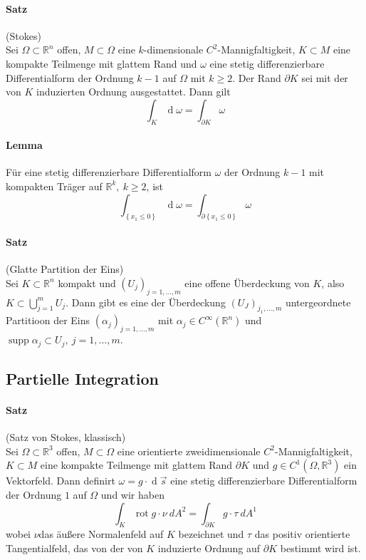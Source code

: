 \documentclass[12pt,a4paper,fleqn]{article}
\def\set#1{{\left\{ #1 \right\}}}
\def\R{{\mathbb{R}}}
\def\d{{\operatorname{d}}}
\begin{document}
\paragraph{Satz} (Stokes)\\
Sei $\Omega\subset\R^n$ offen, $M\subset\Omega$ eine $k$-dimensionale $C^2$-Mannigfaltigkeit, $K\subset M$ eine kompakte Teilmenge mit glattem Rand und $\omega$ eine stetig differenzierbare Differentialform der Ordnung $k-1$ auf $\Omega$ mit $k\geq 2$. Der Rand $\partial K$ sei mit der von $K$ induzierten Ordnung ausgestattet. Dann gilt
\begin{displaymath}
\int_K \d\omega = \int_{\partial K} \omega
\end{displaymath}

\paragraph{Lemma} Für eine stetig differenzierbare Differentialform $\omega$ der Ordnung $k-1$ mit kompakten Träger auf $\R^k,\ k\geq 2$, ist 
\begin{displaymath}
\int_{\set{x_1\leq 0}} \d \omega = \int_{\partial \set{x_1 \leq 0}} \omega
\end{displaymath}

\paragraph{Satz} (Glatte Partition der Eins)\\
Sei $K\subset \R^n$ kompakt und $(U_j)_{j=1, \dots, m}$ eine offene Überdeckung von $K$, also ${K\subset\bigcup_{j=1}^m U_j}$. Dann gibt es eine der Überdeckung $(U_J)_{j_1, \dots, m}$ untergeordnete Partitioon der Eins $(\alpha_j)_{j=1, \dots, m}$ mit $\alpha_j \in C^\infty(\R^n)$ und $\operatorname{supp} \alpha_j \subset U_j,\ j=1, \dots, m$.

\subsection{Partielle Integration}

\paragraph{Satz} (Satz von Stokes, klassisch)\\
Sei $\Omega\subset\R^3$ offen, $M\subset \Omega$ eine orientierte zweidimensionale $C^2$-Mannigfaltigkeit, $K\subset M$ eine kompakte Teilmenge mit glattem Rand $\partial K$ und $g\in C^1(\Omega, \R^3)$ ein Vektorfeld. Dann definirt $\omega=g\cdot\d \overrightarrow{s}$ eine stetig differenzierbare Differentialform der Ordnung $1$ auf $\Omega$ und wir haben
\begin{displaymath}
\int_K \operatorname{rot} g \cdot \nu\ dA^2 = \int_{\partial K} g \cdot \tau\ dA^1
\end{displaymath}
wobei $\nu$das äußere Normalenfeld auf $K$ bezeichnet und $\tau$ das positiv orientierte Tangentialfeld, das von der von $K$ induzierte Ordnung auf $\partial K$ bestimmt wird ist.
\end{document}
